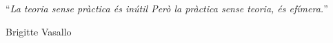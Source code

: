 \documentclass[
11pt, %
english, %
onehalfspacing %
]{MastersDoctoralThesis} %
\begin{document}
\noindent\enquote{\itshape La teoria sense pràctica és inútil
Però la pràctica sense teoria, és efímera.}\bigbreak

\hfill Brigitte Vasallo


\begin{abstract}
\addchaptertocentry{\abstractname} %

%

\end{abstract}


\begin{resum}
\addchaptertocentry{\resumname} %

%

\end{resum}

\end{document}
